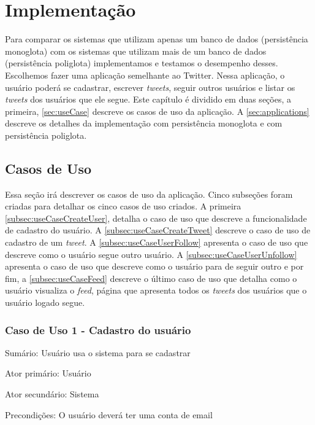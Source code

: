 \chapter{Implementação}
\label{chap:implementacao}
Para comparar os sistemas que utilizam apenas um banco de dados (persistência monoglota) com os sistemas que utilizam mais de um banco de dados (persistência poliglota) implementamos e testamos o desempenho desses. Escolhemos fazer uma aplicação semelhante ao Twitter. Nessa aplicação, o usuário poderá se cadastrar, escrever \textit{tweets}, seguir outros usuários e listar os \textit{tweets} dos usuários que ele segue. Este capítulo é dividido em duas seções, a primeira, \autoref{sec:useCase} descreve os casos de uso da aplicação. A \autoref{sec:applications} descreve os detalhes da implementação com persistência monoglota e com persistência poliglota.

\section{Casos de Uso}
\label{sec:useCase}
Essa seção irá descrever os casos de uso da aplicação. Cinco subseções foram criadas para detalhar os cinco casos de uso criados. A primeira \autoref{subsec:useCaseCreateUser}, detalha o caso de uso que descreve a funcionalidade de cadastro do usuário. A \autoref{subsec:useCaseCreateTweet} descreve o caso de uso de cadastro de um \textit{tweet}. A \autoref{subsec:useCaseUserFollow} apresenta o caso de uso que descreve como o usuário segue outro usuário. A \autoref{subsec:useCaseUserUnfollow} apresenta o caso de uso que descreve como o usuário para de seguir outro e por fim, a \autoref{subsec:useCaseFeed} descreve o último caso de uso que detalha como o usuário visualiza o \textit{feed}, página que apresenta todos os \textit{tweets} dos usuários que o usuário logado segue.


\subsection{Caso de Uso 1 - Cadastro do usuário}
\label{subsec:useCaseCreateUser}

Sumário: Usuário usa o sistema para se cadastrar

Ator primário: Usuário

Ator secundário: Sistema

Precondições: O usuário deverá ter uma conta de email


